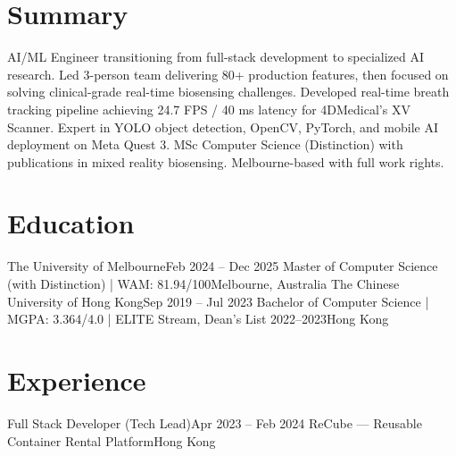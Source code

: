 \documentclass[letterpaper,11pt]{article}
\begin{document}
\makecvheader

\section{Summary}
\small{
AI/ML Engineer transitioning from full-stack development to specialized AI research. Led 3-person team delivering 80+ production features, then focused on solving clinical-grade real-time biosensing challenges. Developed real-time breath tracking pipeline achieving 24.7 FPS / 40 ms latency for 4DMedical's XV Scanner. Expert in YOLO object detection, OpenCV, PyTorch, and mobile AI deployment on Meta Quest 3. MSc Computer Science (Distinction) with publications in mixed reality biosensing. Melbourne-based with full work rights.
}

\section{Education}
  \resumeSubHeadingListStart
    \resumeSubheading
      {The University of Melbourne}{Feb 2024 -- Dec 2025}
      {Master of Computer Science (with Distinction) | WAM: 81.94/100}{Melbourne, Australia}
    \resumeSubheading
      {The Chinese University of Hong Kong}{Sep 2019 -- Jul 2023}
      {Bachelor of Computer Science | MGPA: 3.364/4.0 | ELITE Stream, Dean's List 2022--2023}{Hong Kong}
  \resumeSubHeadingListEnd

\section{Experience}
  \resumeSubHeadingListStart
    \resumeSubheading
      {Full Stack Developer (Tech Lead)}{Apr 2023 -- Feb 2024}
      {ReCube — Reusable Container Rental Platform}{Hong Kong}
      \resumeItemListStart
      \resumeItemListEnd
  \resumeSubHeadingListEnd
\end{document}

